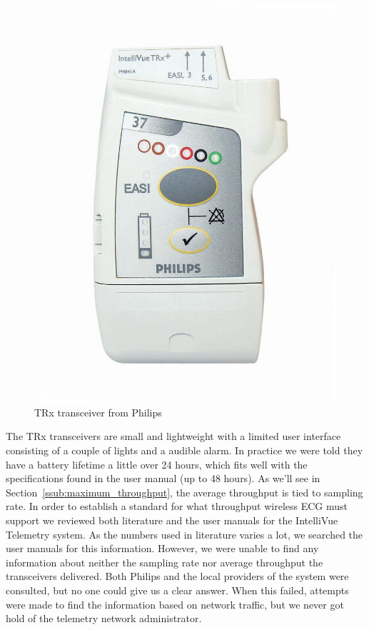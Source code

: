 \begin{figure}
\includegraphics[width=1\linewidth]{img/trx.jpg} 
\caption{TRx transceiver from Philips}
\label{fig:subim1}
\end{figure}

The TRx transceivers are small and lightweight with a limited user interface consisting of a couple of lights and a audible alarm. In practice we were told they have a battery lifetime a little over 24 hours, which fits well with the specifications found in the user manual (up to 48 hours). As we'll see in Section~\ref{ssub:maximum_throughput}, the average throughput is tied to sampling rate. In order to establish a standard for what throughput wireless ECG must support we reviewed both literature and the user manuals for the IntelliVue Telemetry system. As the numbers used in literature varies a lot, we searched the user manuals for this information. However, we were unable to find any information about neither the sampling rate nor average throughput the transceivers delivered. Both Philips and the local providers of the system were consulted, but no one could give us a clear answer. When this failed, attempts were made to find the information based on network traffic, but we never got hold of the telemetry network administrator.

